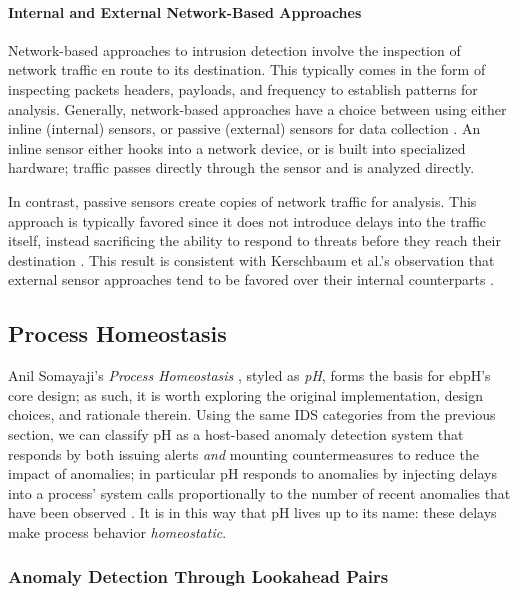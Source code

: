 \documentclass[
  12pt]{findlay}
\begin{document}
\hypertarget{internal-and-external-network-based-approaches}{%
\paragraph{Internal and External Network-Based
Approaches}\label{internal-and-external-network-based-approaches}}

Network-based approaches \autocite{stallings07} to intrusion detection
involve the inspection of network traffic en route to its destination.
This typically comes in the form of inspecting packets headers,
payloads, and frequency to establish patterns for analysis. Generally,
network-based approaches have a choice between using either inline
(internal) sensors, or passive (external) sensors for data collection
\autocite{stallings07}. An inline sensor either hooks into a network
device, or is built into specialized hardware; traffic passes directly
through the sensor and is analyzed directly.

In contrast, passive sensors create copies of network traffic for
analysis. This approach is typically favored since it does not introduce
delays into the traffic itself, instead sacrificing the ability to
respond to threats before they reach their destination
\autocite{stallings07}. This result is consistent with Kerschbaum et
al.'s observation that external sensor approaches tend to be favored
over their internal counterparts \autocite{spafford02}.

\hypertarget{process-homeostasis}{%
\subsection{Process Homeostasis}\label{process-homeostasis}}

Anil Somayaji's \emph{Process Homeostasis} \autocite{soma02}, styled as
\emph{pH}, forms the basis for ebpH's core design; as such, it is worth
exploring the original implementation, design choices, and rationale
therein. Using the same IDS categories from the previous section, we can
classify pH as a host-based anomaly detection system that responds by
both issuing alerts \emph{and} mounting countermeasures to reduce the
impact of anomalies; in particular pH responds to anomalies by injecting
delays into a process' system calls proportionally to the number of
recent anomalies that have been observed \autocite{soma02}. It is in
this way that pH lives up to its name: these delays make process
behavior \emph{homeostatic}.

\hypertarget{anomaly-detection-through-lookahead-pairs}{%
\subsubsection{Anomaly Detection Through Lookahead
Pairs}\label{anomaly-detection-through-lookahead-pairs}}
\end{document}
